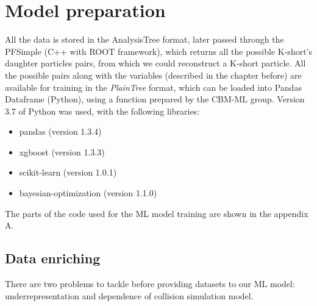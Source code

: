 \section{Model preparation}\thispagestyle{fancy}
All the data is stored in the AnalysisTree format, later passed through the PFSimple (C++ with ROOT framework),  which returns all the possible K-short's daughter particles pairs, from which we could reconstruct a K-short particle. All the possible pairs along with the variables (described in the chapter before) are available for training in the \emph{PlainTree} format, which can be loaded into Pandas Dataframe (Python), using a function prepared by the CBM-ML group\cite{plaintree}. Version 3.7 of Python was used, with the following libraries:
\begin{itemize}
    \item pandas (version 1.3.4)
    \item xgboost (version 1.3.3)
    \item scikit-learn (version 1.0.1)
    \item bayesian-optimization (version 1.1.0)
\end{itemize}
The parts of the code used for the ML model training are shown in the appendix A.

\subsection{Data enriching}
There are two problems to tackle before providing datasets to our ML model: underrepresentation and dependence of collision simulation model.

